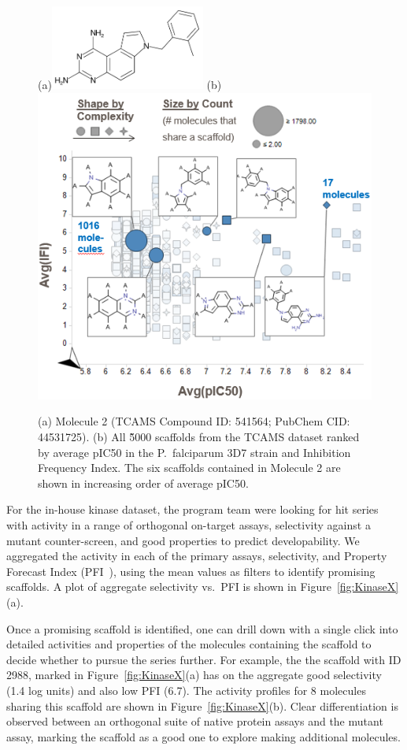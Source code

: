 \documentclass[journal=jacsat,manuscript=article]{achemso}
\newcommand*\fref[1]{Figure~\ref{fig:#1}}
\newcommand*\vs{vs.~}
\begin{document}
\begin{figure}
  (a)\includegraphics[width=2in]{fig/tcam2_mol_541564.png}
  (b)\includegraphics[width=5in]{fig/RGT_aggr_prop2.png}
  \caption{(a) Molecule 2 (TCAMS Compound ID: 541564; PubChem CID: 44531725).
    (b) All \~5000 scaffolds from the TCAMS dataset ranked by
    average pIC50 in the P.~falciparum 3D7 strain and Inhibition
    Frequency Index. The six scaffolds contained in Molecule 2
    are shown in increasing order of average pIC50.}
\label{fig:RGTaggr}   
\end{figure}

For the in-house kinase dataset, the program team were looking for hit series with activity in a range of orthogonal on-target assays, selectivity against a mutant counter-screen, and good properties to predict developability.  We aggregated the activity in each of the primary assays, selectivity, and Property Forecast Index (PFI~\cite{Young2011}), using the mean values as filters to identify promising scaffolds.  A plot of aggregate selectivity \vs PFI is shown in \fref{KinaseX}(a).

Once a promising scaffold is identified, one can drill down with a single click into detailed activities and properties of the molecules containing the scaffold to decide whether to pursue the series further. For example, the
the scaffold with ID 2988, marked in \fref{KinaseX}(a) has on the aggregate good selectivity (1.4 log units) and also low PFI (6.7). The activity profiles for 8
molecules sharing this scaffold are shown in \fref{KinaseX}(b). Clear differentiation is observed between an orthogonal suite of native protein assays and the mutant assay, marking the scaffold as a good one to explore making additional molecules.
\end{document}
